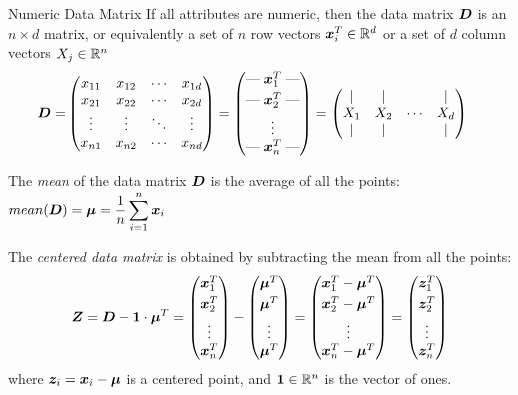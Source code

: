 \begin{frame}{Numeric Data Matrix}
  \small
  If all attributes are numeric, then the data matrix
${\boldsymbol D}$ is an $n \times d$ matrix,
 or equivalently a set of $n$ row vectors
${\boldsymbol x}_i^T
\in {\mathord{\mathbb R}}^d$
or a set of $d$ column vectors
$X_{j} \in {\mathord{\mathbb R}}^n$
\begin{align*}
        \bD = &
        \matr{%
            x_{11} & x_{12} & \cdots & x_{1d}\\
            x_{21} & x_{22} & \cdots & x_{2d}\\
            \vdots & \vdots & \ddots & \vdots\\
            x_{n1} & x_{n2} & \cdots & x_{nd}
        }
        = \matr{\mbox{---} \; \bx_1^T \; \mbox{---}\\[0.3em]
                \mbox{---} \; \bx_2^T \; \mbox{---}\\[0.3em]
                \vdots\\
                \mbox{---} \; \bx_n^T \; \mbox{---}}
        = \matr{
            | & | & & |\\
            X_1 & X_2 & \cdots & X_d\\
            | & | & & |
            }
\end{align*}

The {\em mean} of the data matrix ${\boldsymbol D}$ is the average of all the points:
    $\displaystyle mean({\boldsymbol D}) = {\bm \mu} = {1 \over n} \sum_{i=1}^n {\boldsymbol x}_i$

The {\em centered
data matrix} is obtained by
subtracting the mean from all the points:
\begin{align}
{\boldsymbol Z} = {\boldsymbol D} - \mathbf{1} \cdot {\bm \mu}^T
= \begin{pmatrix} {\boldsymbol x}_1^T\\[0.3em] {\boldsymbol x}_2^T\\[0.3em] \vdots \\ {\boldsymbol x}_n^T \end{pmatrix} -
  \begin{pmatrix} {\bm \mu}^T\\[0.3em] {\bm \mu}^T \\[0.3em] \vdots \\{\bm \mu}^T \end{pmatrix}
        = \begin{pmatrix} {\boldsymbol x}_1^T - {\bm \mu}^T\\[0.3em] {\boldsymbol x}_2^T - {\bm \mu}^T \\[0.3em] \vdots \\
        {\boldsymbol x}_n^T-{\bm \mu}^T \end{pmatrix}
        = \begin{pmatrix} {\boldsymbol z}_1^T \\[0.3em] {\boldsymbol z}_2^T \\[0.3em] \vdots \\{\boldsymbol z}_n^T \end{pmatrix}
    \label{eq:eda:data:centered}
\end{align}
where ${\boldsymbol z}_i = {\boldsymbol x}_i - {\bm \mu}$ is a centered point,
and $\mathbf{1} \in {\mathord{\mathbb R}}^n$
is the vector of ones.
\end{frame}

